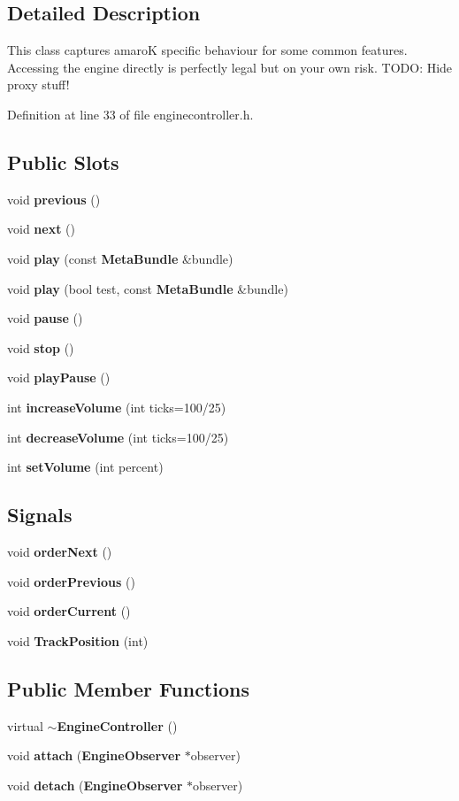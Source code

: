 \subsection{Detailed Description}
This class captures amaro\-K specific behaviour for some common features. Accessing the engine directly is perfectly legal but on your own risk. TODO: Hide proxy stuff! 



Definition at line 33 of file enginecontroller.h.\subsection*{Public Slots}
\begin{CompactItemize}
\item 
void {\bf previous} ()
\item 
void {\bf next} ()
\item 
void {\bf play} (const {\bf Meta\-Bundle} \&bundle)
\item 
void {\bf play} (bool test, const {\bf Meta\-Bundle} \&bundle)
\item 
void {\bf pause} ()
\item 
void {\bf stop} ()
\item 
void {\bf play\-Pause} ()
\item 
int {\bf increase\-Volume} (int ticks=100/25)
\item 
int {\bf decrease\-Volume} (int ticks=100/25)
\item 
int {\bf set\-Volume} (int percent)
\end{CompactItemize}
\subsection*{Signals}
\begin{CompactItemize}
\item 
void {\bf order\-Next} ()
\item 
void {\bf order\-Previous} ()
\item 
void {\bf order\-Current} ()
\item 
void {\bf Track\-Position} (int)
\end{CompactItemize}
\subsection*{Public Member Functions}
\begin{CompactItemize}
\item 
virtual {\bf $\sim$Engine\-Controller} ()
\item 
void {\bf attach} ({\bf Engine\-Observer} $\ast$observer)
\item 
void {\bf detach} ({\bf Engine\-Observer} $\ast$observer)
\end{CompactItemize}
